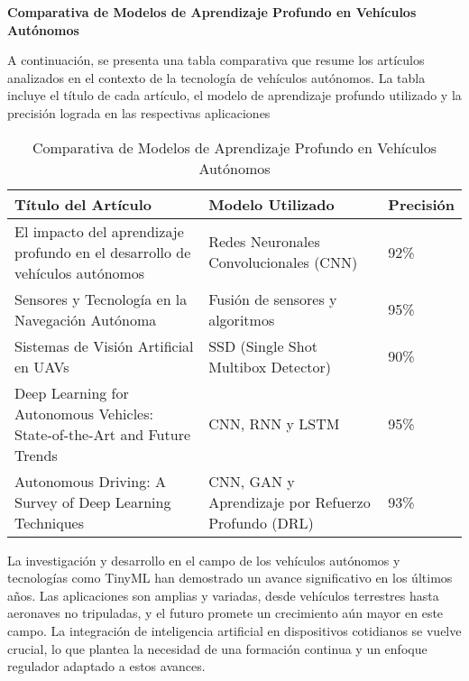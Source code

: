 \textbf{Comparativa de Modelos de Aprendizaje Profundo en Vehículos Autónomos}

A continuación, se presenta una tabla comparativa que resume los artículos analizados en el contexto de la tecnología de vehículos autónomos. La tabla incluye el título de cada artículo, el modelo de aprendizaje profundo utilizado y la precisión lograda en las respectivas aplicaciones
\begin{table}[ht]
    \centering
    \small %
    \begin{tabular}{|p{5cm}|p{5cm}|p{2cm}|} %
        \hline
        \textbf{Título del Artículo} & \textbf{Modelo Utilizado} & \textbf{Precisión} \\ \hline
        El impacto del aprendizaje profundo en el desarrollo de vehículos autónomos & Redes Neuronales Convolucionales (CNN) & 92\% \\ \hline
        Sensores y Tecnología en la Navegación Autónoma & Fusión de sensores y algoritmos & 95\% \\ \hline
        Sistemas de Visión Artificial en UAVs & SSD (Single Shot Multibox Detector) & 90\% \\ \hline
        Deep Learning for Autonomous Vehicles: State-of-the-Art and Future Trends & CNN, RNN y LSTM & 95\% \\ \hline
        Autonomous Driving: A Survey of Deep Learning Techniques & CNN, GAN y Aprendizaje por Refuerzo Profundo (DRL) & 93\% \\ \hline
    \end{tabular}
    \caption{Comparativa de Modelos de Aprendizaje Profundo en Vehículos Autónomos}
    \label{tab:comparativa_modelos}
\end{table}

La investigación y desarrollo en el campo de los vehículos autónomos y tecnologías como TinyML han demostrado un avance significativo en los últimos años. Las aplicaciones son amplias y variadas, desde vehículos terrestres hasta aeronaves no tripuladas, y el futuro promete un crecimiento aún mayor en este campo. La integración de inteligencia artificial en dispositivos cotidianos se vuelve crucial, lo que plantea la necesidad de una formación continua y un enfoque regulador adaptado a estos avances.


